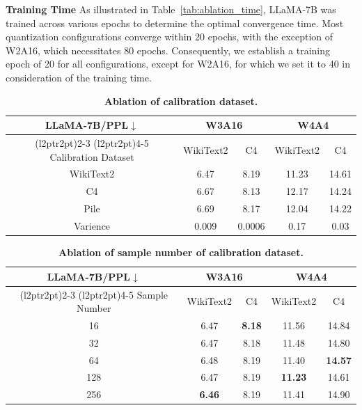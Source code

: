 \documentclass{article} %
\begin{document}
\textbf{Training Time}
As illustrated in Table~\ref{tab:ablation_time}, LLaMA-7B was trained across various epochs to determine the optimal convergence time. Most quantization configurations converge within 20 epochs, with the exception of W2A16, which necessitates 80 epochs. Consequently, we establish a training epoch of 20 for all configurations, except for W2A16, for which we set it to 40 in consideration of the training time.


\begin{table}[!ht]
    \centering
    \caption{\textbf{Ablation of calibration dataset.}}
    \begin{tabular}{ccccc}
    \hline
    \multicolumn{1}{c}{LLaMA-7B/\textbf{PPL}$\downarrow$} & \multicolumn{2}{c}{\textbf{W3A16}} & 
    \multicolumn{2}{c}{\textbf{W4A4}} \\ 
    \cmidrule(l{2pt}r{2pt}){2-3}
    \cmidrule(l{2pt}r{2pt}){4-5} 
    Calibration Dataset &  WikiText2 & C4 & WikiText2 & C4  \\
    \hline
    WikiText2 &  6.47 & 8.19 & 11.23 & 14.61 \\
    C4 & 6.67 & 8.13 & 12.17 & 14.24 \\  
    Pile & 6.69 & 8.17 & 12.04 & 14.22 \\
    \hline
    Varience & 0.009 & 0.0006 & 0.17 & 0.03 \\
    \hline
    \end{tabular}
    \label{tab:ablation_data}
\end{table}

\begin{table}[!ht]
    \centering
    \caption{\textbf{Ablation of sample number of calibration dataset.}}
    \begin{tabular}{ccccc}
    \hline
    \multicolumn{1}{c}{LLaMA-7B/\textbf{PPL}$\downarrow$} & \multicolumn{2}{c}{\textbf{W3A16}} & 
    \multicolumn{2}{c}{\textbf{W4A4}} \\ 
    \cmidrule(l{2pt}r{2pt}){2-3}
    \cmidrule(l{2pt}r{2pt}){4-5} 
    Sample Number &  WikiText2 & C4 & WikiText2 & C4  \\
    \hline
    16 &  6.47 & \textbf{8.18} & 11.56 & 14.84 \\
    32 & 6.47 & 8.18 & 11.48 & 14.80 \\  
    64 & 6.48 & 8.19 & 11.40 & \textbf{14.57} \\
    128 & 6.47 & 8.19 & \textbf{11.23} & 14.61 \\
    256 & \textbf{6.46} & 8.19 & 11.41 & 14.90\\
    \hline
    \end{tabular}
    \label{tab:ablation_data_number}
\end{table}
\end{document}
